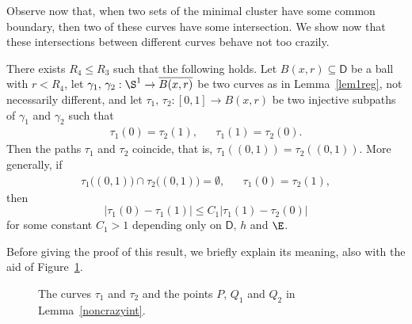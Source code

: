 Observe now that, when two sets of the minimal cluster have some common boundary, then two of these curves have some intersection. We show now that these intersections between different curves behave not too crazily.

\begin{lem}\label{noncrazyint}
There exists $R_4\leq R_3$ such that the following holds. Let $B(x,r)\subseteq \mathsf{D}$ be a ball with $r< R_4$, let $\gamma_1,\,\gamma_2:\S^1\to \overline{B(x,r)}$ be two curves as in Lemma~\ref{lem1reg}, not necessarily different, and let $\tau_1,\,\tau_2:[0,1]\to B(x,r)$ be two injective subpaths of $\gamma_1$ and $\gamma_2$ such that
\begin{align*}
\tau_1(0)=\tau_2(1), && \tau_1(1)=\tau_2(0).
\end{align*}
Then the paths $\tau_1$ and $\tau_2$ coincide, that is, $\tau_1((0,1))=\tau_2((0,1))$. More generally, if
\begin{align*}
\tau_1\big((0,1)\big)\cap \tau_2\big((0,1)\big) = \emptyset, && \tau_1(0)=\tau_2(1),
\end{align*}
then
\begin{equation}\label{thesisnci}
\big|\tau_1(0)-\tau_1(1)\big| \leq C_1 |\tau_1(1)-\tau_2(0)|
\end{equation}
for some constant $C_1> 1$ depending only on $\mathsf{D},\,h$ and $\E$.
\end{lem}
Before giving the proof of this result, we briefly explain its meaning, also with the aid of Figure~\ref{Fignoncrazy}.
\begin{figure}[htbp]
\caption{The curves $\tau_1$ and $\tau_2$ and the points $P$, $Q_1$ and $Q_2$ in Lemma~\ref{noncrazyint}.}\label{Fignoncrazy}
\end{figure}
